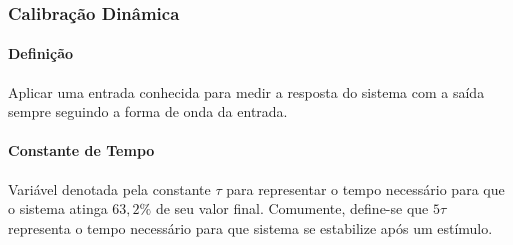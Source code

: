 \documentclass{article}
\begin{document}
        \subsubsection{Calibração Dinâmica}
            \paragraph{Definição}Aplicar uma entrada conhecida para medir a resposta do sistema com a saída sempre seguindo a forma de onda da entrada.

            \paragraph{Constante de Tempo}Variável denotada pela constante $\tau$ para representar o tempo necessário para que o sistema atinga $63,2\%$ de seu valor final. Comumente, define-se que $5\tau$ representa o tempo necessário para que sistema se estabilize após um estímulo.
\end{document}
